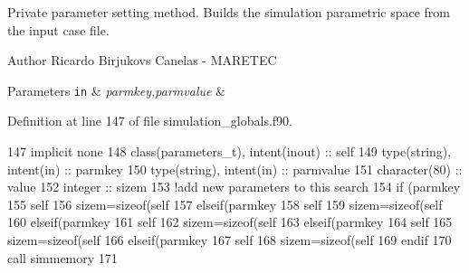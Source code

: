 Private parameter setting method. Builds the simulation parametric space from the input case file. 

\begin{DoxyAuthor}{Author}
Ricardo Birjukovs Canelas -\/ M\+A\+R\+E\+T\+EC
\end{DoxyAuthor}

\begin{DoxyParams}[1]{Parameters}
\mbox{\tt in}  & {\em parmkey,parmvalue} & \\
\hline
\end{DoxyParams}


Definition at line 147 of file simulation\+\_\+globals.\+f90.


\begin{DoxyCode}
147     \textcolor{keywordtype}{implicit none}
148     \textcolor{keywordtype}{class}(parameters\_t), \textcolor{keywordtype}{intent(inout)} :: self
149     \textcolor{keywordtype}{type}(string), \textcolor{keywordtype}{intent(in)} :: parmkey
150     \textcolor{keywordtype}{type}(string), \textcolor{keywordtype}{intent(in)} :: parmvalue
151     \textcolor{keywordtype}{character(80)} :: value
152     \textcolor{keywordtype}{integer} :: sizem
153     \textcolor{comment}{!add new parameters to this search}
154     \textcolor{keywordflow}{if} (parmkey%
155         self%
156         sizem=sizeof(self%
157     \textcolor{keywordflow}{elseif}(parmkey%
158         self%
159         sizem=sizeof(self%
160     \textcolor{keywordflow}{elseif}(parmkey%
161         self%
162         sizem=sizeof(self%
163     \textcolor{keywordflow}{elseif}(parmkey%
164         self%
165         sizem=sizeof(self%
166     \textcolor{keywordflow}{elseif}(parmkey%
167         self%
168         sizem=sizeof(self%
169 \textcolor{keywordflow}{    endif}
170     \textcolor{keyword}{call }simmemory%
171 
\end{DoxyCode}
\mbox{\label{namespacesimulation__globals__mod_a68a87c39cf88bad353e28e367a721ed4}} 

